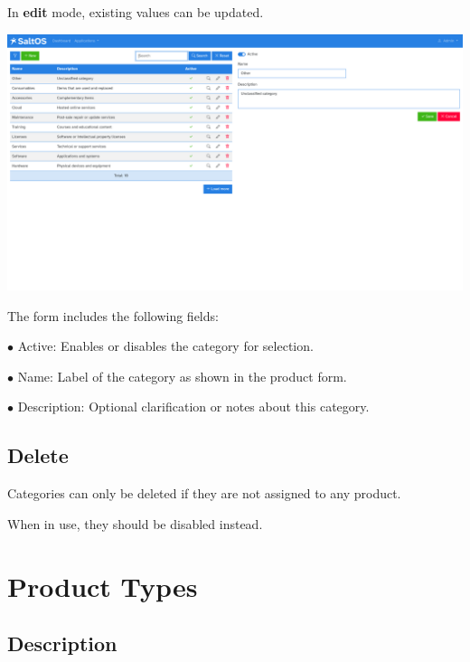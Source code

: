 \documentclass[a4paper]{article}
\begin{document}
In \textbf{edit} mode, existing values can be updated.

\begin{center}\includegraphics[width=1\textwidth]{../ujest/snaps/test-screenshots-js-screenshots-sales-products-categories-edit-10-en-us-1-snap.png}\end{center}

The form includes the following fields:

\begin{compactitem}
\item[\color{myblue}$\bullet$] Active: Enables or disables the category for selection.
\item[\color{myblue}$\bullet$] Name: Label of the category as shown in the product form.
\item[\color{myblue}$\bullet$] Description: Optional clarification or notes about this category.
\end{compactitem}

\hypertarget{toc160}{}
\subsection{Delete}

Categories can only be deleted if they are not assigned to any product.

When in use, they should be disabled instead.


\hypertarget{toc161}{}
\section{Product Types}

\hypertarget{toc162}{}
\subsection{Description}
\end{document}
